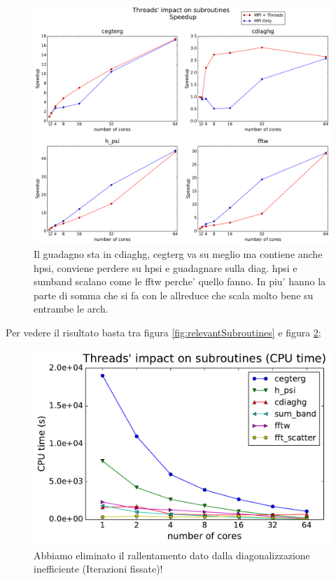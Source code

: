 \documentclass[a4paper,12pt]{article}
\begin{document}
\begin{figure}[hhh!]
\centerline{ \includegraphics[width=\linewidth]{threads_subroutines.pdf}	}
	\caption{Il guadagno sta in cdiaghg, cegterg va su meglio ma contiene anche hpsi, conviene perdere su hpsi e guadagnare sulla diag. hpsi e sumband scalano come le fftw perche' quello fanno. In piu' hanno la parte di somma che si fa con le allreduce che scala molto bene su entrambe le arch.}
	\label{fig:threadsSubroutines}

\end{figure}

\newpage

Per vedere il risultato basta tra figura \ref{fig:relevantSubroutines} e figura \ref{fig:threadsRelevantSubroutines};
\begin{figure}[hhh!]
\centerline{ \includegraphics[width=0.7\linewidth]{threads_relevant_subroutines.pdf}	}
	\caption{Abbiamo eliminato il rallentamento dato dalla diagonalizzazione inefficiente (Iterazioni fissate)!}
	\label{fig:threadsRelevantSubroutines}
\end{figure}
\end{document}
